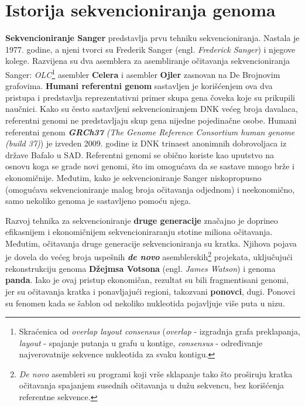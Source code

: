 \documentclass[12pt,oneside]{memoir}
\begin{document}
\section{Istorija sekvencioniranja genoma}

\textbf{Sekvencioniranje Sanger} predstavlja prvu tehniku sekvencioniranja. Nastala je 1977. godine, a njeni tvorci su Frederik Sanger (engl. \textit{Frederick Sanger}) i njegove kolege. Razvijena su dva asemblera za asembliranje očitavanja sekvencioniranja Sanger: \textit{OLC}\footnote{Skraćenica od \textit{overlap layout consensus} (\textit{overlap} - izgradnja grafa preklapanja,
\textit{layout} - spajanje putanja u grafu u kontige, \textit{consensus} - određivanje najverovatnije sekvence
nukleotida za svaku kontigu.} asembler \textbf{Celera} i asembler \textbf{Ojler} zasnovan na De Brojnovim grafovima. \textbf{Humani referentni genom} sastavljen je korišćenjem ova dva pristupa i predstavlja reprezentativni primer skupa gena čoveka koje su prikupili naučnici. Kako su često sastavljeni sekvencioniranjem DNK većeg broja davalaca, referentni genomi ne predstavljaju skup gena nijedne pojedinačne osobe. Humani referentni genom \textit{\textbf{GRCh37}} \textit{(The Genome Reference Consortium human genome (build 37)}) je izveden 2009. godine iz DNK trinaest anonimnih dobrovoljaca iz države Bafalo u SAD. Referentni genomi se obično koriste kao uputstvo na osnovu koga se grade novi genomi, što im omogućava da se sastave mnogo brže i ekonomičnije. Međutim, kako je sekvencioniranje Sanger niskopropusno (omogućava sekvencioniranje malog broja očitavanja odjednom) i neekonomično, samo nekoliko genoma je sastavljeno pomoću njega.

Razvoj tehnika za sekvencioniranje \textbf{druge generacije} značajno je doprineo efikasnijem i ekonomičnijem sekvencioniraranju stotine miliona očitavanja. Međutim, očitavanja druge generacije sekvencioniranja su kratka. Njihova pojava je dovela do većeg broja uspešnih \textbf{\textit{de novo}} asemblerskih\footnote{\textit{De novo} asembleri su programi
koji vrše sklapanje tako što proširuju kratka očitavanja spajanjem susednih
očitavanja u dužu sekvencu, bez korišćenja referentne sekvence.} projekata, uključujući rekonstrukciju genoma \textbf{Džejmsa Votsona} (engl. \textit{James Watson}) i genoma \textbf{panda}. Iako je ovaj pristup ekonomičan, rezultat su bili fragmentisani genomi, jer su očitavanja kratka i ponavljajući regioni, takozvani \textbf{ponovci}, dugi. Ponovci su fenomen kada se šablon od nekoliko nukleotida pojavljuje više puta u nizu.
\end{document}
